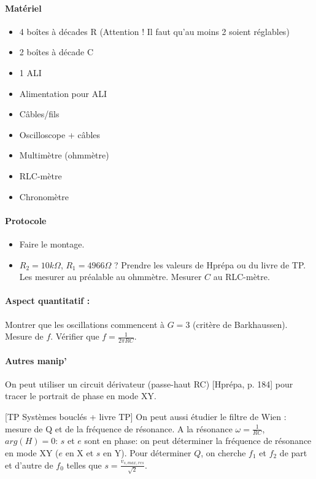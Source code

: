 \documentclass[11pt]{report}
\numberwithin{figure}{section}
\numberwithin{equation}{section}
\numberwithin{table}{section}
\newcommand{\1}{\boldsymbol{1}}
\begin{document}
\begin{tcolorbox}[breakable, enhanced, colback=red!2!white,colframe=mycolor!85!black,title=\textbf{\textbf{Expérience}}]
\paragraph*{Matériel}
\begin{itemize}
\item 4 boîtes à décades R (Attention ! Il faut qu'au moins 2 soient réglables)
\item 2 boîtes à décade C
\item 1 ALI
\item Alimentation pour ALI 
\item Câbles/fils
\item Oscilloscope + câbles
\item Multimètre (ohmmètre)
\item RLC-mètre
\item Chronomètre
\end{itemize}

\paragraph*{Protocole } 

\begin{itemize}[label=$\triangleright$]
		\item Faire le montage.
		\item $R_2 = 10 k \Omega$, $R_1 = 4966 \Omega$ ? Prendre les valeurs de Hprépa ou du livre de TP. Les mesurer au préalable au ohmmètre. Mesurer $C$ au RLC-mètre.
\end{itemize}

\paragraph*{Aspect quantitatif :} Montrer que les oscillations commencent à $G=3$ (critère de Barkhaussen). Mesure de $f$. Vérifier que $f = \frac{1}{2 \pi RC}$.

\paragraph{Autres manip'}
On peut utiliser un circuit dérivateur (passe-haut RC) [Hprépa, p. 184] pour tracer le portrait de phase en mode XY.

[TP Systèmes bouclés + livre TP] On peut aussi étudier le filtre de Wien : mesure de Q et de la fréquence de résonance. A la résonance $\omega = \frac{1}{RC}$, $arg(H) = 0$: $s$ et $e$ sont en phase: on peut déterminer la fréquence de résonance en mode XY ($e$ en X et $s$ en Y). Pour déterminer $Q$, on cherche $f_1$ et $f_2$ de part et d'autre de $f_0$ telles que $s = \frac{v_{s,max,res}}{\sqrt{2}}$.

\end{tcolorbox}
\end{document}
